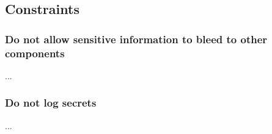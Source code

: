 \subsection{Constraints}

\subsubsection*{Do not allow sensitive information to bleed to other components}
...

\subsubsection*{Do not log secrets}
...

